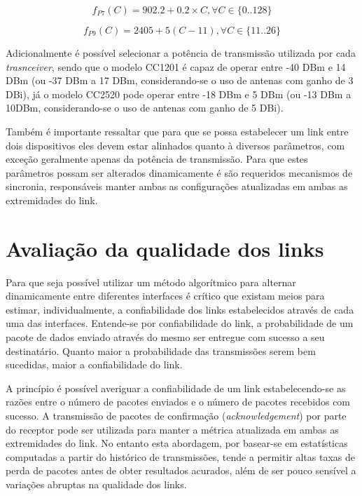 \documentclass{article}
\begin{document}
	\begin{equation}
		\label{eq:ch915fsk}
		f_{P7}(C) = 902.2 + 0.2 \times C, \forall C \in \{0..128\}
	\end{equation}
		
	\begin{equation}
		\label{eq:ch2450oqpsk}
		f_{P9}(C) = 2405 + 5 (C - 11), \forall C \in \{11..26\}
	\end{equation}

	Adicionalmente é possível selecionar a potência de transmissão utilizada por cada \textit{trasnceiver}, sendo que o modelo CC1201 é capaz de operar entre -40 DBm e 14 DBm (ou -37 DBm a 17 DBm, considerando-se o uso de antenas com ganho de 3 DBi), já o modelo CC2520 pode operar entre -18 DBm e 5 DBm (ou -13 DBm a 10DBm, considerando-se o uso de antenas com ganho de 5 DBi).

	Também é importante ressaltar que para que se possa estabelecer um link entre dois dispositivos eles devem estar alinhados quanto à diversos parâmetros, com exceção geralmente apenas da potência de transmissão. Para que estes parâmetros possam ser alterados dinamicamente é são requeridos mecanismos de sincronia, responsáveis manter ambas as configurações atualizadas em ambas as extremidades do link.

\section{Avaliação da qualidade dos links}
	Para que seja possível utilizar um método algorítmico para alternar dinamicamente entre diferentes interfaces é crítico que existam meios para estimar, individualmente, a confiabilidade dos links estabelecidos através de cada uma das interfaces.  
	Entende-se por confiabilidade do link, a probabilidade de um pacote de dados enviado através do mesmo ser entregue com sucesso a seu destinatário. Quanto maior a probabilidade das transmissões serem bem sucedidas, maior a confiabilidade do link. 

	A princípio é possível averiguar a confiabilidade de um link estabelecendo-se as razões entre o número de pacotes enviados e o número de pacotes recebidos com sucesso. A transmissão de pacotes de confirmação (\textit{acknowledgement}) por parte do receptor pode ser utilizada para manter a métrica atualizada em ambas as extremidades do link. No entanto esta abordagem, por basear-se em estatísticas computadas a partir do histórico de transmissões, tende a permitir altas taxas de perda de pacotes antes de obter resultados acurados, além de ser pouco sensível a variações abruptas na qualidade dos links.
	
\end{document}
